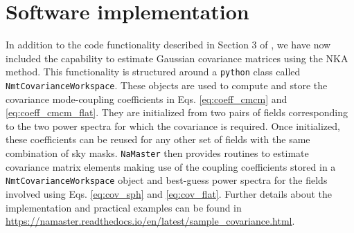 \documentclass[a4paper,11pt]{article}
\begin{document}
  \section{Software implementation}\label{app:namaster}
    In addition to the code functionality described in Section 3 of \cite{2019MNRAS.484.4127A}, we have now included the capability to estimate Gaussian covariance matrices using the NKA method. This functionality is structured around a {\tt python} class called {\tt NmtCovarianceWorkspace}. These objects are used to compute and store the covariance mode-coupling coefficients in Eqs. \ref{eq:coeff_cmcm} and \ref{eq:coeff_cmcm_flat}. They are initialized from two pairs of fields corresponding to the two power spectra for which the covariance is required. Once initialized, these coefficients can be reused for any other set of fields with the same combination of sky masks. {\tt NaMaster} then provides routines to estimate covariance matrix elements making use of the coupling coefficients stored in a {\tt NmtCovarianceWorkspace} object and best-guess power spectra for the fields involved using Eqs. \ref{eq:cov_sph} and \ref{eq:cov_flat}. Further details about the implementation and practical examples can be found in \url{https://namaster.readthedocs.io/en/latest/sample_covariance.html}.

  
  
\end{document}
